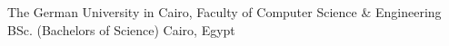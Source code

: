 \begin{cventries}
    
\vspace{-1ex}



  \cventry
    {The German University in Cairo, Faculty of Computer Science \& Engineering}  %
    {BSc. (Bachelors of Science)} %
    {}%
    {Cairo, Egypt} %
    {	
    }
    
    
    
    
    



\end{cventries}
